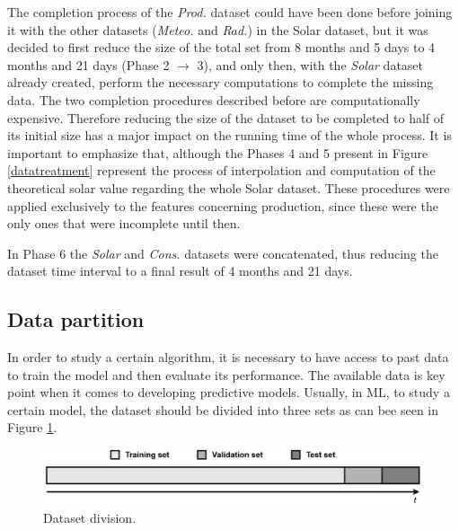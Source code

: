 The completion process of the \textit{Prod.} dataset could have been done before joining it with the other datasets (\textit{Meteo.} and \textit{Rad.}) in the Solar dataset, but it was decided to first reduce the size of the total set from 8 months and 5 days to 4 months and 21 days (Phase 2 $\to$ 3), and only then, with the \textit{Solar} dataset already created, perform the necessary computations to complete the missing data. The two completion procedures described before are computationally expensive. Therefore reducing the size of the dataset to be completed to half of its initial size has a major impact on the running time of the whole process. It is important to emphasize that, although the Phases 4 and 5 present in Figure \ref{datatreatment} represent the process of interpolation and computation of the theoretical solar value regarding the whole Solar dataset. These procedures were applied exclusively to the features concerning production, since these were the only ones that were incomplete until then.



In Phase 6 the \textit{Solar} and \textit{Cons.} datasets were concatenated, thus reducing the dataset time interval to a final result of 4 months and 21 days.

\subsection{Data partition}\label{chap3:subsec:data_partition}

In order to study a certain algorithm, it is necessary to have access to past data to train the model and then evaluate its performance. The available data is key point when it comes to developing predictive models. Usually, in \ac{ML}, to study a certain model, the dataset should be divided into three sets as can bee seen in Figure \ref{division}. 

\begin{figure}[h!]
    \centering
    \begin{center}
    \includegraphics[width=1\textwidth]{Images/division.png}
    \caption{Dataset division.}
    \label{division}
    \end{center}
\end{figure}

